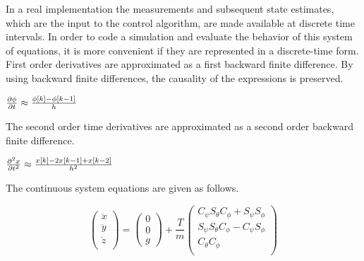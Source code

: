 In a real implementation the measurements and subsequent state estimates, which are the input to the control algorithm, are made available at discrete time intervals. In order to code a simulation and evaluate the behavior of this system of equations, it is more convenient if they are represented in a discrete-time form. First order derivatives are approximated as a first backward finite difference. By using backward finite differences, the causality of the expressions is preserved.

$\frac{\partial\phi}{\partial t } \approx \frac{\phi[k] - \phi[k-1]}{h}$

The second order time derivatives are approximated as a second order backward finite difference.

$\frac{\partial^2 x }{\partial t^2 } \approx \frac{x[k] -2 x[k-1] + x[k-2]}{h^2}$

The continuous system equations are given as follows.

\begin{equation}
    \left(
        \begin{array}{c}
           \ddot{x}\\
           \ddot{y}\\
           \ddot{z}\\
        \end{array}
    \right)
    = \left(
       \begin{array}{c}
        0\\
        0\\
        g
      \end{array}
    \right)
    +\frac{T}{m}
     \left(
        \begin{array}{c}
             C_{\psi}S_{\theta}C_{\phi} + S_{\psi}S_{\phi} \\
             S_{\psi}S_{\theta}C_{\phi} - C_{\psi}S_{\phi} \\
             C_{\theta} C_{\phi} \\
        \end{array}
    \right)
\end{equation}

